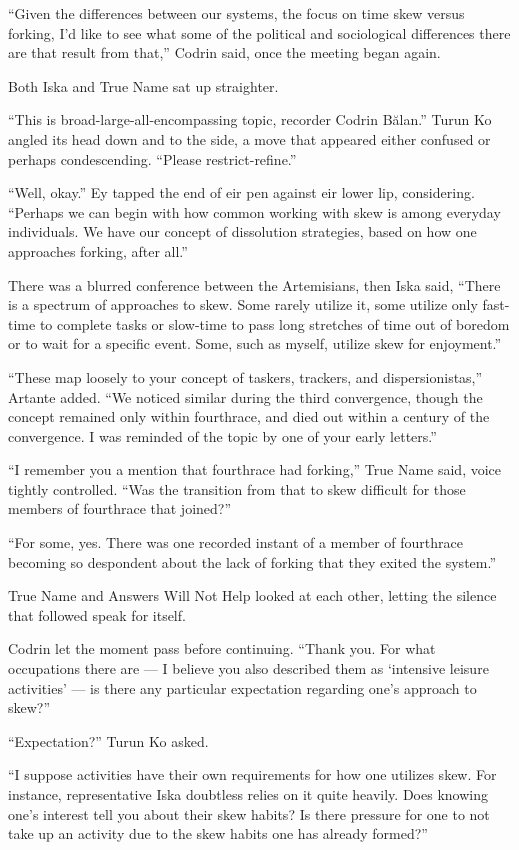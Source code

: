 ``Given the differences between our systems, the focus on time skew versus forking, I'd like to see what some of the political and sociological differences there are that result from that,'' Codrin said, once the meeting began again.

Both Iska and True Name sat up straighter.

``This is broad-large-all-encompassing topic, recorder Codrin Bălan.'' Turun Ko angled its head down and to the side, a move that appeared either confused or perhaps condescending. ``Please restrict-refine.''

``Well, okay.'' Ey tapped the end of eir pen against eir lower lip, considering. ``Perhaps we can begin with how common working with skew is among everyday individuals. We have our concept of dissolution strategies, based on how one approaches forking, after all.''

There was a blurred conference between the Artemisians, then Iska said, ``There is a spectrum of approaches to skew. Some rarely utilize it, some utilize only fast-time to complete tasks or slow-time to pass long stretches of time out of boredom or to wait for a specific event. Some, such as myself, utilize skew for enjoyment.''

``These map loosely to your concept of taskers, trackers, and dispersionistas,'' Artante added. ``We noticed similar during the third convergence, though the concept remained only within fourthrace, and died out within a century of the convergence. I was reminded of the topic by one of your early letters.''

``I remember you a mention that fourthrace had forking,'' True Name said, voice tightly controlled. ``Was the transition from that to skew difficult for those members of fourthrace that joined?''

``For some, yes. There was one recorded instant of a member of fourthrace becoming so despondent about the lack of forking that they exited the system.''

True Name and Answers Will Not Help looked at each other, letting the silence that followed speak for itself.

Codrin let the moment pass before continuing. ``Thank you. For what occupations there are — I believe you also described them as `intensive leisure activities' — is there any particular expectation regarding one's approach to skew?''

``Expectation?'' Turun Ko asked.

``I suppose activities have their own requirements for how one utilizes skew. For instance, representative Iska doubtless relies on it quite heavily. Does knowing one's interest tell you about their skew habits? Is there pressure for one to not take up an activity due to the skew habits one has already formed?''

